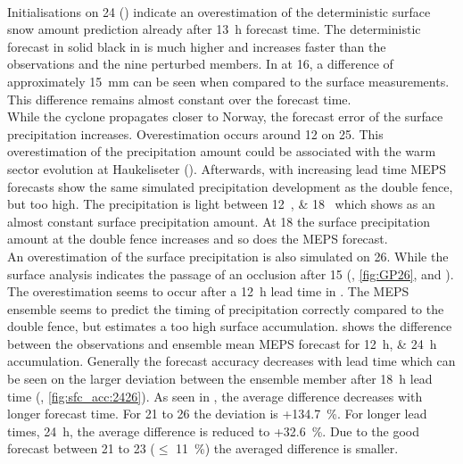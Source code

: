 \\
Initialisations on \SI{24}{\dec} () indicate an overestimation of the deterministic surface snow amount prediction already after \SI{13}{\hour} forecast time. The deterministic forecast in solid black in  is much higher and increases faster than the observations and the nine perturbed members. In  at \SI{16}{\UTC}, a difference of approximately \SI{15}{\mm} can be seen when compared to the surface measurements. This difference remains almost constant over the forecast time. 
\\
While the cyclone propagates closer to Norway, the forecast error of the surface precipitation increases. Overestimation occurs around \SI{12}{\UTC} on \SI{25}{\dec}. This overestimation of the precipitation amount could be associated with the warm sector evolution at Haukeliseter (). Afterwards, with increasing lead time MEPS forecasts show the same simulated precipitation development as the double fence, but too high. The precipitation is light between \SIlist{12;18}{\UTC} which shows as an almost constant surface precipitation amount. At \SI{18}{\UTC} the surface precipitation amount at the double fence increases and so does the MEPS forecast.
\\
An overestimation of the surface precipitation is also simulated on \SI{26}{\dec}. While the surface analysis indicates the passage of an occlusion after \SI{15}{\UTC} (, \ref{fig:GP26}, and ). The overestimation seems to occur after a \SI{12}{\hour} lead time in . 
The MEPS ensemble seems to predict the timing of precipitation correctly compared to the double fence, but estimates a too high surface accumulation.
 shows the difference between the observations and ensemble mean MEPS forecast for \SIlist{12;24}{\hour} accumulation. Generally the forecast accuracy decreases with lead time which can be seen on the larger deviation between the ensemble member after \SI{18}{\hour} lead time (, \ref{fig:sfc_acc:2426}). As seen in , the average difference decreases with longer forecast time. For \num{21} to \SI{26}{\dec} the deviation is +\SI{134.7}{\percent}. For longer lead times, \SI{24}{\hour}, the average difference is reduced to +\SI{32.6}{\percent}. Due to the good forecast between \num{21} to \SI{23}{\dec} ($\le$ \SI{11}{\percent}) the averaged difference is smaller. 
